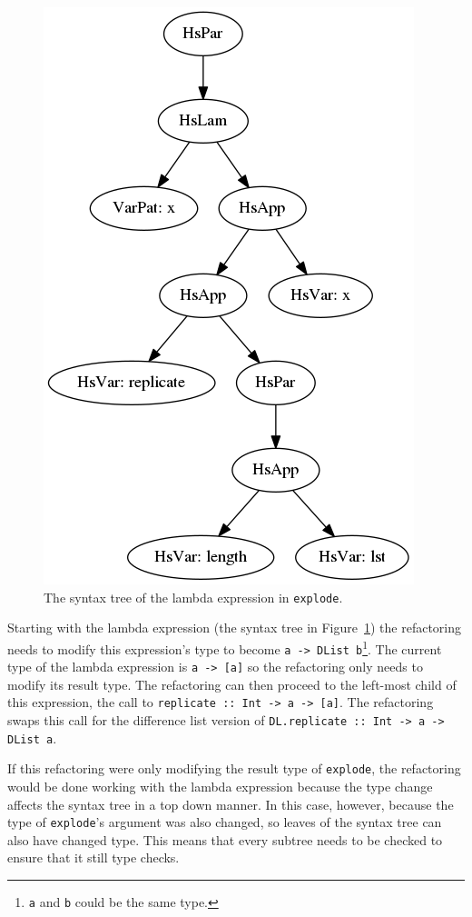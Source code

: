 \begin{figure}[h]
	\begin{center}
		\includegraphics[scale=.5]{graphVis/Chapter3/explodeLam.png}
	\end{center}
	\caption{The syntax tree of the lambda expression in \texttt{explode}.}\label{explodeLam}
\end{figure}

Starting with the lambda expression (the syntax tree in Figure~\ref{explodeLam}) the refactoring needs to modify this expression's type to become \texttt{a -> DList b}\footnote{\texttt{a} and \texttt{b} could be the same type.}. The current type of the lambda expression is \texttt{a -> [a]} so the refactoring only needs to modify its result type. The refactoring can then proceed to the left-most child of this expression, the call to \texttt{replicate :: Int -> a -> [a]}. The refactoring swaps this call for the difference list version of \texttt{DL.replicate :: Int -> a -> DList a}. 

If this refactoring were only modifying the result type of \texttt{explode}, the refactoring would be done working with the lambda expression because the type change affects the syntax tree in a top down manner. In this case, however, because  the type of \texttt{explode}'s argument was also changed, so leaves of the syntax tree can also have changed type. This means that every subtree needs to be checked to ensure that it still type checks.

